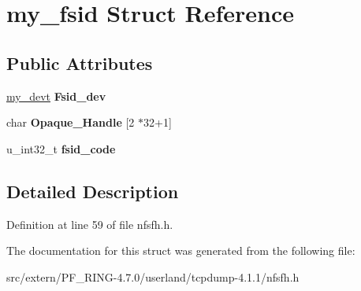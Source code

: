 \hypertarget{structmy__fsid}{
\section{my\_\-fsid Struct Reference}
\label{structmy__fsid}
}
\subsection*{Public Attributes}
\begin{DoxyCompactItemize}
\item 
\hypertarget{structmy__fsid_af6a34f4ddac98fc1b2328586796450e2}{
\hyperlink{structmy__devt}{my\_\-devt} {\bfseries Fsid\_\-dev}}
\label{structmy__fsid_af6a34f4ddac98fc1b2328586796450e2}

\item 
\hypertarget{structmy__fsid_a083fb500c9c7004b584abb242e0f30e4}{
char {\bfseries Opaque\_\-Handle} \mbox{[}2 $\ast$32+1\mbox{]}}
\label{structmy__fsid_a083fb500c9c7004b584abb242e0f30e4}

\item 
\hypertarget{structmy__fsid_aa7efc0031804a735eb82e9e21ecc9a29}{
u\_\-int32\_\-t {\bfseries fsid\_\-code}}
\label{structmy__fsid_aa7efc0031804a735eb82e9e21ecc9a29}

\end{DoxyCompactItemize}


\subsection{Detailed Description}


Definition at line 59 of file nfsfh.h.



The documentation for this struct was generated from the following file:\begin{DoxyCompactItemize}
\item 
src/extern/PF\_\-RING-\/4.7.0/userland/tcpdump-\/4.1.1/nfsfh.h\end{DoxyCompactItemize}
